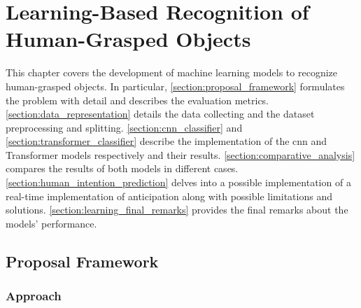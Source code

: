 \chapter{Learning-Based Recognition of Human-Grasped Objects}
\label{chapter:learning}

This chapter covers the development of machine learning models to recognize human-grasped objects. In particular, \autoref{section:proposal_framework} formulates the problem with detail and describes the evaluation metrics. \autoref{section:data_representation} details the data collecting and the dataset preprocessing and splitting. \autoref{section:cnn_classifier} and \autoref{section:transformer_classifier} describe the implementation of the \acs{cnn} and Transformer models respectively and their results. \autoref{section:comparative_analysis} compares the results of both models in different cases. \autoref{section:human_intention_prediction} delves into a possible implementation of a real-time implementation of anticipation along with possible limitations and solutions. \autoref{section:learning_final_remarks} provides the final remarks about the models' performance.

\section{Proposal Framework}
\label{section:proposal_framework}

\subsection{Approach}

